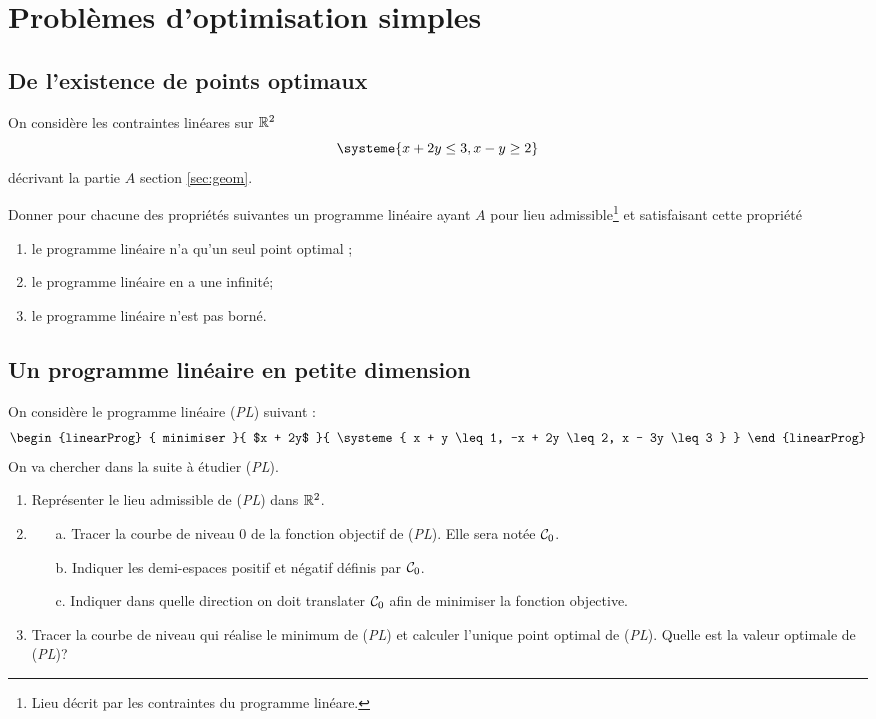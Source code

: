 \documentclass[11pt, a4paper]{article}
\begin{document}
\section{Problèmes d'optimisation simples}

\subsection{De l'existence de points optimaux}

On considère les contraintes linéares sur $\mathbb{R}^2$
\[
\systeme{
  x + 2y \leq 3,
  x - y  \geq 2
}
\]
décrivant la partie $A$ section \ref{sec:geom}.
\begin{question}{1.5}
  Donner pour chacune des propriétés suivantes un programme linéaire
  ayant $A$ pour lieu admissible\footnote{Lieu décrit par les
    contraintes du programme linéare.} et satisfaisant cette propriété
  \begin{enumerate}
  \item le programme linéaire n'a qu'un seul point optimal ;
  \item le programme linéaire en a une infinité;
  \item le programme linéaire n'est pas borné.
  \end{enumerate}
\end{question}

\subsection{Un programme linéaire en petite dimension}

\noindent On considère le programme linéaire (\emph{PL}) suivant :
\begin{displaymath}
  \begin{linearProg} {
      minimiser
    }{
      $x + 2y$
    }{
      \systeme{
        x + y \leq 1,
        -x + 2y \leq 2,
        x - 3y \leq 3
      }
    }
  \end{linearProg}
\end{displaymath}
On va chercher dans la suite à étudier (\emph{PL}).
\begin{question}{4}
  \begin{enumerate}
  \item Représenter le lieu admissible de (\emph{PL}) dans $\mathbb{R}^2$.
  \item
    \begin{enumerate}
    \item[a.]  Tracer la courbe de niveau $0$ de la fonction objectif
      de (\emph{PL}). Elle sera notée $\mathcal{C}_0$.
    \item[b.]  Indiquer les demi-espaces positif et négatif définis
      par $\mathcal{C}_0$.
    \item[c.]  Indiquer dans quelle direction on doit translater
      $\mathcal{C}_0$ afin de minimiser la fonction objective.
    \end{enumerate}
  \item
    Tracer la courbe de niveau qui réalise le minimum de (\emph{PL})
    et calculer l'unique point optimal de (\emph{PL}). Quelle est la
    valeur optimale de (\emph{PL})?
  \end{enumerate}
\end{question}
\end{document}
